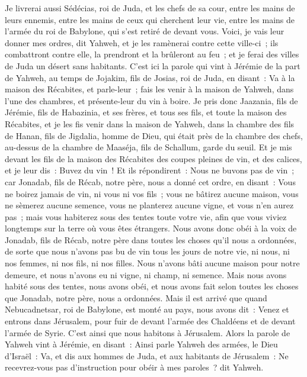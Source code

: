 \begin{multicols}{2}
Je livrerai aussi Sédécias, roi de Juda, et les chefs de sa cour, entre les mains de leurs ennemis, entre les mains de ceux qui cherchent leur vie, entre les mains de l'armée du roi de Babylone, qui s'est retiré de devant vous.
Voici, je vais leur donner mes ordres, dit Yahweh, et je les ramènerai contre cette ville-ci~; ils combattront contre elle, la prendront et la brûleront au feu~; et je ferai des villes de Juda un désert sans habitants.
\VerseOne{}C'est ici la parole qui vint à Jérémie de la part de Yahweh, au temps de Jojakim, fils de Josias, roi de Juda, en disant~:
Va à la maison des Récabites, et parle-leur~; fais les venir à la maison de Yahweh, dans l'une des chambres, et présente-leur du vin à boire.
Je pris donc Jaazania, fils de Jérémie, fils de Habazinia, et ses frères, et tous ses fils, et toute la maison des Récabites,
et je les fis venir dans la maison de Yahweh, dans la chambre des fils de Hanan, fils de Jigdalia, homme de Dieu, qui était près de la chambre des chefs, au-dessus de la chambre de Maaséja, fils de Schallum, garde du seuil.
Et je mis devant les fils de la maison des Récabites des coupes pleines de vin, et des calices, et je leur dis~: Buvez du vin~!
Et ils répondirent~: Nous ne buvons pas de vin~; car Jonadab, fils de Récab, notre père, nous a donné cet ordre, en disant~: Vous ne boirez jamais de vin, ni vous ni vos fils~;
vous ne bâtirez aucune maison, vous ne sèmerez aucune semence, vous ne planterez aucune vigne, et vous n'en aurez pas~; mais vous habiterez sous des tentes toute votre vie, afin que vous viviez longtemps sur la terre où vous êtes étrangers.
Nous avons donc obéi à la voix de Jonadab, fils de Récab, notre père dans toutes les choses qu'il nous a ordonnées, de sorte que nous n'avons pas bu de vin tous les jours de notre vie, ni nous, ni nos femmes, ni nos fils, ni nos filles.
Nous n'avons bâti aucune maison pour notre demeure, et nous n'avons eu ni vigne, ni champ, ni semence.
Mais nous avons habité sous des tentes, nous avons obéi, et nous avons fait selon toutes les choses que Jonadab, notre père, nous a ordonnées.
Mais il est arrivé que quand Nebucadnetsar, roi de Babylone, est monté au pays, nous avons dit~: Venez et entrons dans Jérusalem, pour fuir de devant l'armée des Chaldéens et de devant l'armée de Syrie. C'est ainsi que nous habitons à Jérusalem.
Alors la parole de Yahweh vint à Jérémie, en disant~:
Ainsi parle Yahweh des armées, le Dieu d'Israël~: Va, et dis aux hommes de Juda, et aux habitants de Jérusalem~: Ne recevrez-vous pas d'instruction pour obéir à mes paroles~? dit Yahweh.

\end{multicols}
